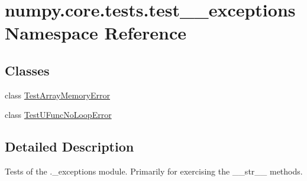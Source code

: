 \hypertarget{namespacenumpy_1_1core_1_1tests_1_1test____exceptions}{}\section{numpy.\+core.\+tests.\+test\+\_\+\+\_\+exceptions Namespace Reference}
\label{namespacenumpy_1_1core_1_1tests_1_1test____exceptions}
\subsection*{Classes}
\begin{DoxyCompactItemize}
\item 
class \hyperlink{classnumpy_1_1core_1_1tests_1_1test____exceptions_1_1TestArrayMemoryError}{Test\+Array\+Memory\+Error}
\item 
class \hyperlink{classnumpy_1_1core_1_1tests_1_1test____exceptions_1_1TestUFuncNoLoopError}{Test\+U\+Func\+No\+Loop\+Error}
\end{DoxyCompactItemize}


\subsection{Detailed Description}
\begin{DoxyVerb}Tests of the ._exceptions module. Primarily for exercising the __str__ methods.
\end{DoxyVerb}
 
